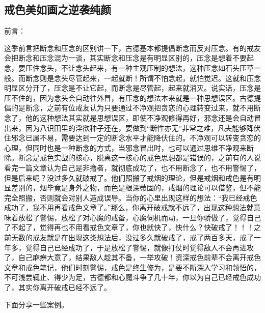 \subsection{戒色美如画之逆袭纯颜}

前言：

这季前言把断念和压念的区别讲一下，古德基本都提倡断念而反对压念。有的戒友会把断念和压念混为一谈，其实断念和压念是有明显区别的，压念是想着不要起念，要压住念头，不让念头起来，有一种主观压制的想法，这种压念如石头压草一般。而断念则是念头尽管起来，一起就断！所谓不怕念起，就怕觉迟。这就和压念明显区分开了，压念是不让它起，而断念是尽管起，起来就消灭。说实话，压念是压不住的，因为念头会自动往外冒，有压念的想法本来就是一种思想误区。古德提倡的是断念，之前有位戒友认为只要通过不净观把贪恋的心理转变过来，就不用断念了，他的这种想法其实就是思想误区，即使不净观修得再好，邪念还是会自动冒出来，因为八识田里的淫欲种子还在，要做到“断性亦无”非常之难，凡夫能够降伏住邪念已属不易，需要达到一定的断念水平才能降伏住的。不净观可以转变贪恋的心理，但同时也是一种断念的方式，当邪念冒出时，也可以通过思维不净观来断除。断念是戒色实战的核心，脱离这一核心的戒色思想都是错误的，之前有的人说看完一篇文章认为自己是非撸者，就彻底成功了，也不用断念了，也不用警惕了，但是后来呢？没过多久就破戒了。他们照搬了戒烟的理论，但是戒烟和戒色是有明显差别的，烟毕竟是身外之物，而色是根深蒂固的，戒烟的理论可以借鉴，但不能完全照搬，否则就会对别人造成误导。当你的心里出现这样的想法：“我已经戒色成功了，我不用再看戒色文章了。”那么，你离开破戒就不远了，出现这种想法就意味着放松了警惕，放松了对心魔的戒备，心魔伺机而动，一旦你骄傲了，觉得自己了不起了，觉得再也不用看戒色文章了，你也就快了，快什么？快破戒了！！！之前无数的戒友就是在出现这类想法后，没过多久就破戒了，戒了两百多天，戒了一年多，觉得自己已经成功了，于是放松了警惕，就像打仗时觉得敌人不会再进攻了，自己麻痹大意了，结果敌人趁其不备，一举攻破！资深戒色前辈不会离开戒色文章和戒色笔记，他们时刻警惕，戒色是终生修为，是要不断深入学习和领悟的，不可浅尝辄止、得少为足，古德都和心魔斗争了几十年，你以为自己已经戒色成功了，其实你离开破戒已经不远了。

下面分享一些案例。


